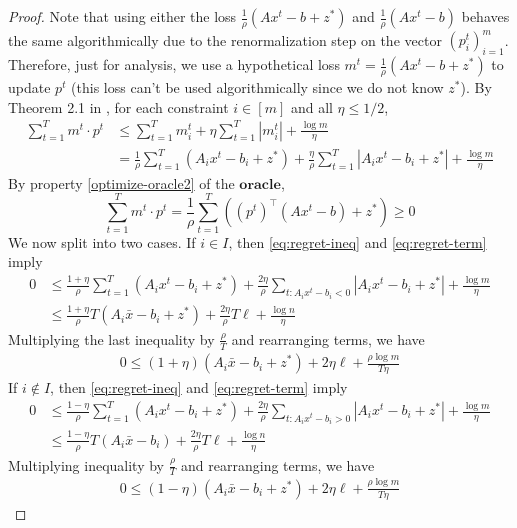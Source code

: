 \documentclass{article}
\newcommand{\oracle}{\mathbf{oracle}}
\begin{document}
\begin{proof}
 Note that using either the loss \(\frac{1}{\rho}(Ax^t-b+z^*)\)  and \(\frac{1}{\rho}(Ax^t-b)\) behaves the same algorithmically due to the renormalization  step on the vector \((p_i^t)_{i=1}^m\). Therefore, just for analysis, we use a hypothetical loss \(m^t=\frac{1}{\rho}(Ax^t-b+z^*)\) to update \(p^t\) (this loss can't be used  algorithmically since we do not know \(z^*\)). By Theorem 2.1 in   \citet{arora2012multiplicative}, for each constraint \(i\in[m]\) and all \(\eta\leq1/2\),
\begin{align}
\sum_{t=1}^T m^t \cdot p^t &\leq \sum_{t=1}^T m_i^t + \eta\sum_{t=1}^T |m_i^t|+\frac{\log m}{\eta} \nonumber \\
&= \frac{1}{\rho}\sum_{t=1}^T (A_i x^t - b_i+z^*) +\frac{\eta}{\rho}\sum_{t=1}^T |A_i x^t - b_i+z^*|+\frac{\log m}{\eta} \label{eq:regret-ineq}
\end{align}
By property \eqref{optimize-oracle2} of the  \(\oracle\),
\begin{equation}
\sum_{t=1}^T m^t \cdot p^t =\frac{1}{\rho} \sum_{t=1}^T \left((p^t)^\top(Ax^t-b)+z^*\right) \geq0 \label{eq:regret-term}
\end{equation}
We now split into two cases. If \(i\in I\), then \eqref{eq:regret-ineq} and \eqref{eq:regret-term} imply
\begin{align*}
0&\leq \frac{1+\eta}{\rho}\sum_{t=1}^T (A_i x^t - b_i+z^*) +\frac{2\eta}{\rho}\sum_{t:A_i x^t - b_i<0}|A_i x^t - b_i+z^*|+\frac{\log m}{\eta} \\
&\leq\frac{1+\eta}{\rho}T(A_i\bar{x}-b_i+z^*) +\frac{2\eta}{\rho}T\ell+\frac{\log n}{\eta}
\end{align*}
Multiplying the last inequality by \(\frac{\rho}{T}\) and rearranging terms, we have
\begin{align}
0 \leq (1+\eta)(A_i\bar{x}-b_i+z^*) + 2\eta \ell +\frac{\rho\log m}{T\eta} \label{eq:tune-eta-1}
\end{align}
If \(i\notin I\), then  \eqref{eq:regret-ineq} and \eqref{eq:regret-term} imply
\begin{align*}
0&\leq \frac{1-\eta}{\rho}\sum_{t=1}^T (A_i x^t - b_i+z^*) +\frac{2\eta}{\rho}\sum_{t:A_i x^t - b_i>0}|A_i x^t - b_i+z^*|+\frac{\log m}{\eta} \\
&\leq\frac{1-\eta}{\rho}T(A_i\bar{x}-b_i) +\frac{2\eta}{\rho}T\ell+\frac{\log n}{\eta}
\end{align*}
Multiplying inequality by \(\frac{\rho}{T}\) and rearranging terms, we have
\begin{align}
0 \leq (1-\eta)(A_i\bar{x}-b_i+z^*) + 2\eta\ell+\frac{\rho\log m}{T\eta} \label{eq:tune-eta-2}

\end{align}
\end{proof}
\end{document}
